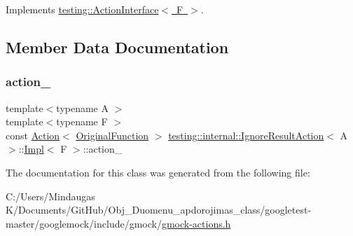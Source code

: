 Implements \mbox{\hyperlink{classtesting_1_1_action_interface_a20f8624fcea1786f2992b358760422a0}{testing\+::\+Action\+Interface$<$ F $>$}}.



\subsection{Member Data Documentation}
\mbox{\label{classtesting_1_1internal_1_1_ignore_result_action_1_1_impl_a7934b7ede40d687b719a65eb8018d182}} 
\subsubsection{\texorpdfstring{action\_}{action\_}}
{\footnotesize\ttfamily template$<$typename A $>$ \\
template$<$typename F $>$ \\
const \mbox{\hyperlink{classtesting_1_1_action}{Action}}$<$ \mbox{\hyperlink{classtesting_1_1internal_1_1_ignore_result_action_1_1_impl_a00db745de37ebae1ee631240098bc2b1}{Original\+Function}} $>$ \mbox{\hyperlink{classtesting_1_1internal_1_1_ignore_result_action}{testing\+::internal\+::\+Ignore\+Result\+Action}}$<$ A $>$\+::\mbox{\hyperlink{classtesting_1_1internal_1_1_ignore_result_action_1_1_impl}{Impl}}$<$ F $>$\+::action\+\_\+\hspace{0.3cm}{\ttfamily [private]}}



The documentation for this class was generated from the following file\+:\begin{DoxyCompactItemize}
\item 
C\+:/\+Users/\+Mindaugas K/\+Documents/\+Git\+Hub/\+Obj\+\_\+\+Duomenu\+\_\+apdorojimas\+\_\+class/googletest-\/master/googlemock/include/gmock/\mbox{\hyperlink{googletest-master_2googlemock_2include_2gmock_2gmock-actions_8h}{gmock-\/actions.\+h}}\end{DoxyCompactItemize}
